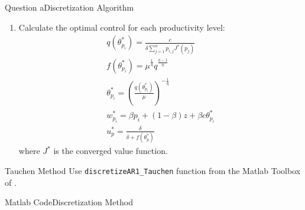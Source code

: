 \documentclass{beamer}
\begin{document}
\begin{frame}[allowframebreaks]{Question a}{Discretization Algorithm}
\begin{enumerate}
\begin{enumerate}
\begin{gather*}
                    J^{(1)}_{p_i} = p_i - w_{p_i} + \delta (1-s)\sum_{j=1}^{n}p_{i,j}J^{(0)}(p_j)
                \end{gather*}
                \item Choose a new grid point for productivity, go through 4.1 to 4.3. Once we have done the update for all productivity grid, we have new system of value function \({V^{(1)}_p}\)
                \item Compute distance between the two systems of value functions following the sup norm \[
                    d = \max\limits_{i\in\{1,\ldots,n\}}|V^{(0)}_i-V^{(1)}_i|\]
                \framebreak
                \item If distance is within the error tolerance level, \(d \leq tol * ||V^{(1)}_1||\), the functions have converged and go to step 5, or else go back to step 4.
            \end{enumerate}
            \item Calculate the optimal control for each productivity level:
            \begin{gather*}
                q(\theta^*_{p_i}) = \frac{c}{\delta \sum_{j=1}^{n}p_{i,j}J^* (p_j)}\\
                f(\theta^*_{p_i}) = \mu^\frac{1}{\eta} q^\frac{\eta-1}{\eta}\\
                \theta^*_{p_i} = (\frac{q(\theta^*_{p_i})}{\mu})^{-\frac{1}{\eta}}\\
                w^*_{p_i} = \beta p_i + (1-\beta)z + \beta c \theta^*_{p_i}\\
                u^*_p = \frac{\delta}{\delta + f(\theta^*_p)}
            \end{gather*}
            where \(J^*\) is the converged value function.
    \end{enumerate}
\end{frame}


\begin{frame}{Tauchen Method}
    Use \texttt{discretizeAR1\_Tauchen} function from the Matlab Toolbox of \cite{Kirkby2023} .
\end{frame}

    
\begin{frame}[allowframebreaks]{Matlab Code}{Discretization Method}
    
\end{frame}
\end{document}

